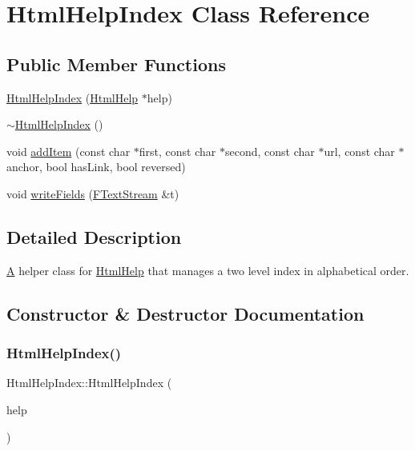\hypertarget{class_html_help_index}{}\section{Html\+Help\+Index Class Reference}
\label{class_html_help_index}
\subsection*{Public Member Functions}
\begin{DoxyCompactItemize}
\item 
\mbox{\hyperlink{class_html_help_index_a9a6f1abc33b6d3679229d9dbd5ed92d9}{Html\+Help\+Index}} (\mbox{\hyperlink{class_html_help}{Html\+Help}} $\ast$help)
\item 
\mbox{\hyperlink{class_html_help_index_a0b68b2ca104803c3a6dc76a18aa05f13}{$\sim$\+Html\+Help\+Index}} ()
\item 
void \mbox{\hyperlink{class_html_help_index_aa6f679550c81eee3249f29395ad7e174}{add\+Item}} (const char $\ast$first, const char $\ast$second, const char $\ast$url, const char $\ast$anchor, bool has\+Link, bool reversed)
\item 
void \mbox{\hyperlink{class_html_help_index_aa7658c0bcf38f46aed6664cd5dbd1be1}{write\+Fields}} (\mbox{\hyperlink{class_f_text_stream}{F\+Text\+Stream}} \&t)
\end{DoxyCompactItemize}


\subsection{Detailed Description}
\mbox{\hyperlink{class_a}{A}} helper class for \mbox{\hyperlink{class_html_help}{Html\+Help}} that manages a two level index in alphabetical order. 

\subsection{Constructor \& Destructor Documentation}
\mbox{\label{class_html_help_index_a9a6f1abc33b6d3679229d9dbd5ed92d9}} 
\subsubsection{\texorpdfstring{HtmlHelpIndex()}{HtmlHelpIndex()}}
{\footnotesize\ttfamily Html\+Help\+Index\+::\+Html\+Help\+Index (\begin{DoxyParamCaption}\item[{\mbox{\hyperlink{class_html_help}{Html\+Help}} $\ast$}]{help }\end{DoxyParamCaption})}


